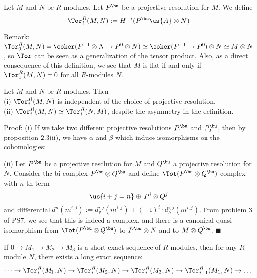 \documentclass[10 pt]{article}
\newtheorem{cor}{Corollary}[section]
\newtheorem{lem}{Lemma}[section]
\newtheorem{prop}{Proposition}[section]
\newtheorem{propconstr}{Proposition-Construction}[section]
\newcommand\begin{lemma}{\begin{lem}}
\newcommand\begin{proposition}{\begin{prop}}
\newcommand\begin{proof}{\begin{proof}}
\newcommand\begin{corollary}{\begin{cor}}
\newcommand\begin{proposition}constr{\begin{propconstr}}
\newcommand\end{definition}{\end{defn}}
\newcommand\end{lemma}{\end{lem}}
\newcommand\end{corollary}{\end{cor}}
\newcommand\end{proposition}{\end{prop}}
\newcommand\end{proof}{\end{proof}}
\newcommand\end{proposition}constr{\end{propconstr}}
\begin{document}
\begin{definition} Let $M$ and $N$ be $R$-modules.  Let $P^\bu$ be a projective resolution for $M$.  We define
$$\Tor^R_i(M,N):= H^{-i}(P^\bu\us{A}\otimes N)$$
\end{definition}

Remark:  $\Tor^R_0(M,N)=\coker(P^{-1}\otimes N\rightarrow P^0\otimes N)\simeq \coker(P^{-1}\rightarrow P^0)\otimes N\simeq M\otimes N$, so $\Tor$ can be seen as a generalization of the tensor product.  Also, as a direct consequence of this definition, we see that $M$ is flat if and only if $\Tor^R_1(M,N)=0$ for all $R$-modules $N$.

\begin{proposition} Let $M$ and $N$ be $R$-modules.  Then\\
(i) $\Tor^R_i(M,N)$ is independent of the choice of projective resolution.\\
(ii) $\Tor^R_i(M,N)\simeq\Tor^R_i(N,M)$, despite the asymmetry in the definition.
\end{proposition}

Proof: (i) If we take two different projective resolutions $P_1^\bu$ and $P_2^\bu$, then by proposition 2.3(ii), we have $\alpha$ and $\beta$ which induce isomorphisms on the cohomologies:\\


(ii) Let $P^\bu$ be a projective resolution for $M$ and $Q^\bu$ a projective resolution for $N$.  Consider the bi-complex $P^\bu\otimes Q^\bu$ and define $\Tot(P^\bu\otimes Q^\bu)$ complex with $n$-th term
$$\us{i+j=n}\oplus\, P^i\otimes Q^j $$
and differential $d^n(m^{i,j}):= d_v^{i,j}(m^{i,j})+(-1)^i\cdot d_h^{i,j}(m^{i,j})$.  From problem 3 of PS7, we see that this is indeed a complex, and there is a canonical quasi-isomorphism from $\Tot(P^\bu\otimes Q^\bu)$ to $P^\bu\otimes N$ and to $M\otimes Q^\bu$. $\blacksquare$

\begin{corollary} If $0\rightarrow M_1\rightarrow M_2\rightarrow M_3$ is a short exact sequence of $R$-modules, then for any $R$-module $N$, there exists a long exact sequence:
$$\dots\rightarrow \Tor_i^R(M_1,N)\rightarrow \Tor_i^R(M_2,N)\rightarrow \Tor_i^R(M_3,N)\rightarrow \Tor_{i-1}^R(M_1,N)\rightarrow\dots$$

\end{corollary}
\end{document}
